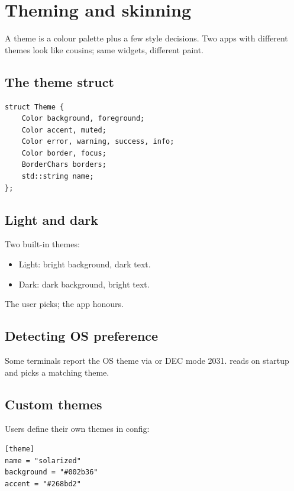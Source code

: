 \chapter{Theming and skinning}
\label{ch:theming}

\begin{aside}
A theme is a colour palette plus a few style decisions. Two
apps with different themes look like cousins; same widgets,
different paint.
\end{aside}

\section{The theme struct}

\begin{lstlisting}
struct Theme {
    Color background, foreground;
    Color accent, muted;
    Color error, warning, success, info;
    Color border, focus;
    BorderChars borders;
    std::string name;
};
\end{lstlisting}

\section{Light and dark}

Two built-in themes:

\begin{itemize}[leftmargin=*]
  \item Light: bright background, dark text.
  \item Dark: dark background, bright text.
\end{itemize}

The user picks; the app honours.

\section{Detecting OS preference}

Some terminals report the OS theme via  or
DEC mode 2031. \maya{} reads on startup and picks a
matching theme.

\section{Custom themes}

Users define their own themes in config:

\begin{lstlisting}
[theme]
name = "solarized"
background = "#002b36"
accent = "#268bd2"
\end{lstlisting}


